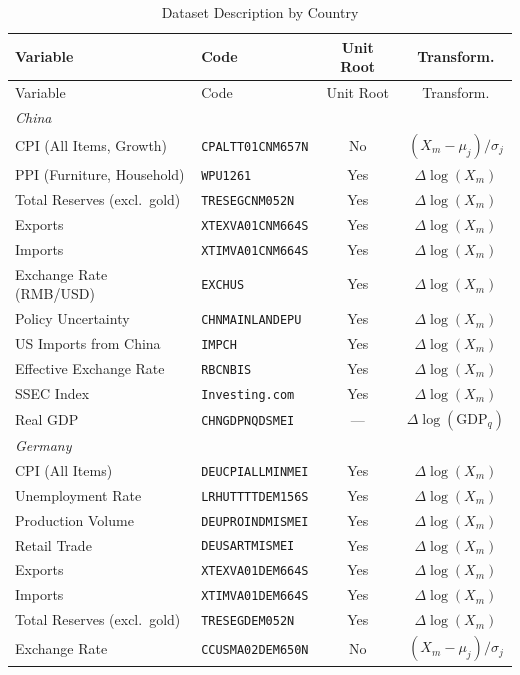 \begin{longtable}{llcc}
\caption{Dataset Description by Country} \label{tab:dataset_all} \\
\toprule
Variable & Code & Unit Root & Transform. \\
\midrule
\endfirsthead
\toprule
Variable & Code & Unit Root & Transform. \\
\midrule
\endhead
\bottomrule
\endfoot
\textit{China} & & & \\
CPI (All Items, Growth) & \texttt{CPALTT01CNM657N} & No & $(X_m - \mu_j)/\sigma_j$ \\
PPI (Furniture, Household) & \texttt{WPU1261} & Yes & $\Delta\log(X_m)$ \\
Total Reserves (excl.\ gold) & \texttt{TRESEGCNM052N} & Yes & $\Delta\log(X_m)$ \\
Exports & \texttt{XTEXVA01CNM664S} & Yes & $\Delta\log(X_m)$ \\
Imports & \texttt{XTIMVA01CNM664S} & Yes & $\Delta\log(X_m)$ \\
Exchange Rate (RMB/USD) & \texttt{EXCHUS} & Yes & $\Delta\log(X_m)$ \\
Policy Uncertainty & \texttt{CHNMAINLANDEPU} & Yes & $\Delta\log(X_m)$ \\
US Imports from China & \texttt{IMPCH} & Yes & $\Delta\log(X_m)$ \\
Effective Exchange Rate & \texttt{RBCNBIS} & Yes & $\Delta\log(X_m)$ \\
SSEC Index & \texttt{Investing.com} & Yes & $\Delta\log(X_m)$ \\
Real GDP & \texttt{CHNGDPNQDSMEI} & --- & $\Delta\log(\text{GDP}_q)$ \\
\addlinespace
\textit{Germany} & & & \\
CPI (All Items) & \texttt{DEUCPIALLMINMEI} & Yes & $\Delta\log(X_m)$ \\
Unemployment Rate & \texttt{LRHUTTTTDEM156S} & Yes & $\Delta\log(X_m)$ \\
Production Volume & \texttt{DEUPROINDMISMEI} & Yes & $\Delta\log(X_m)$ \\
Retail Trade & \texttt{DEUSARTMISMEI} & Yes & $\Delta\log(X_m)$ \\
Exports & \texttt{XTEXVA01DEM664S} & Yes & $\Delta\log(X_m)$ \\
Imports & \texttt{XTIMVA01DEM664S} & Yes & $\Delta\log(X_m)$ \\
Total Reserves (excl.\ gold) & \texttt{TRESEGDEM052N} & Yes & $\Delta\log(X_m)$ \\
Exchange Rate & \texttt{CCUSMA02DEM650N} & No & $(X_m - \mu_j)/\sigma_j$ \\

\end{longtable}
